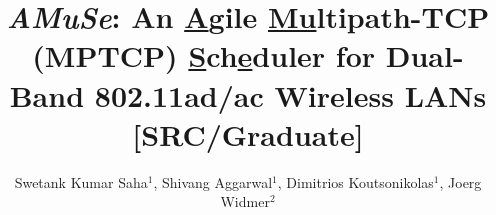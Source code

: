 \documentclass[sigconf]{acmart}
\begin{document}
\newcommand{\name}{\emph{AMuSe}\xspace}

\title{\name: An \underline{A}gile \underline{Mu}ltipath-TCP (MPTCP) \underline{S}ch\underline{e}duler for Dual-Band 802.11ad/ac Wireless LANs [SRC/Graduate]}

\author{Swetank Kumar Saha$^1$, Shivang Aggarwal$^1$, Dimitrios Koutsonikolas$^1$, Joerg Widmer$^2$}

\begin{comment}
\author{Lars Th{\o}rv{\"a}ld}
\authornote{This author is the
  one who did all the really hard work.}
\affiliation{%
  \institution{The Th{\o}rv{\"a}ld Group}
  \streetaddress{1 Th{\o}rv{\"a}ld Circle}
  \city{Hekla}
  \country{Iceland}}
\email{larst@affiliation.org}

\author{Valerie B\'eranger}
\affiliation{%
  \institution{Inria Paris-Rocquencourt}
  \city{Rocquencourt}
  \country{France}
}
\author{Aparna Patel}
\affiliation{%
 \institution{Rajiv Gandhi University}
 \streetaddress{Rono-Hills}
 \city{Doimukh}
 \state{Arunachal Pradesh}
 \country{India}}
\author{Huifen Chan}
\affiliation{%
  \institution{Tsinghua University}
  \streetaddress{30 Shuangqing Rd}
  \city{Haidian Qu}
  \state{Beijing Shi}
  \country{China}
}

\author{Charles Palmer}
\affiliation{%
  \institution{Palmer Research Laboratories}
  \streetaddress{8600 Datapoint Drive}
  \city{San Antonio}
  \state{Texas}
  \postcode{78229}}
\email{cpalmer@prl.com}

\author{John Smith}
\affiliation{\institution{The Th{\o}rv{\"a}ld Group}}
\email{jsmith@affiliation.org}

\author{Julius P.~Kumquat}
\affiliation{\institution{The Kumquat Consortium}}
\email{jpkumquat@consortium.net}
\end{comment}

\renewcommand{\shortauthors}{B. Trovato et al.}
\renewcommand\footnotetextcopyrightpermission[1]{}
\end{document}

